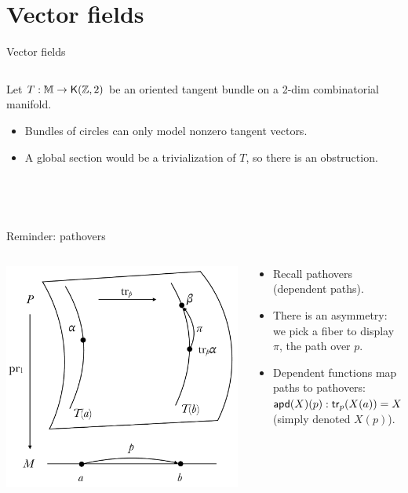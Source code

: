 \section{Vector fields}

\begin{frame}{Vector fields}
\begin{columns}
\begin{column}{0.7\textwidth}
Let \( T:\mathbb{M}\to\mathsf{K}(\mathbb{Z},2) \) be an oriented tangent bundle on a 2-dim combinatorial manifold.
\begin{itemize}
\item Bundles of circles can only model \alert{nonzero} tangent vectors.
\item  A global section would be a trivialization of \( T \), so there is an obstruction.
\end{itemize}
\quad\\~\\
\end{column}
\begin{column}{0.3\textwidth}

\end{column}
\end{columns}
\end{frame}

\begin{frame}{Reminder: pathovers}
\begin{columns}
\begin{column}{0.35\textwidth}
\includegraphics[width=30ex]{figs/pathovers.pdf}
\end{column}
\begin{column}{0.65\textwidth}
\begin{itemize}
\item Recall pathovers (dependent paths).
\item There is an asymmetry: we pick a fiber to display \( \pi \), the path over \( p \).
\item Dependent functions map paths to pathovers: \( \mathsf{apd} (X)(p):\mathsf{tr}_p(X(a))=X(b) \) (simply denoted \( X(p) \)).
\end{itemize}
\end{column}
\end{columns}
\end{frame}

